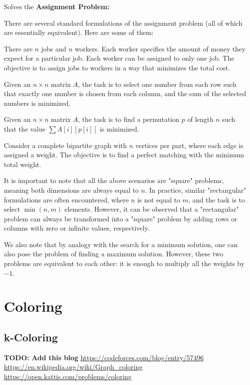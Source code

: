 	Solves the \textbf{Assignment Problem:}

	There are several standard formulations of the assignment problem (all of which are essentially equivalent). Here are some of them:

	There are $n$ jobs and $n$ workers. Each worker specifies the amount of money they expect for a particular job.
	Each worker can be assigned to only one job. The objective is to assign jobs to workers in a way that minimizes the total cost.

	Given an $n \times n$ matrix $A$, the task is to select one number from each row such that exactly 
	one number is chosen from each column, and the sum of the selected numbers is minimized.

	Given an $n \times n$ matrix $A$, the task is to find a permutation $p$ of length $n$ such that the value
	$\sum A[i]\left[p[i]\right]$ is minimized.

	Consider a complete bipartite graph with $n$ vertices per part, where each edge is assigned a weight.
	The objective is to find a perfect matching with the minimum total weight.

	It is important to note that all the above scenarios are "square" problems, meaning both dimensions are always equal to
	$n$. In practice, similar "rectangular" formulations are often encountered, where $n$ is not equal to 
	$m$, and the task is to select $\min(n,m)$ elements. However, it can be observed that a "rectangular" 
	problem can always be transformed into a "square" problem by adding rows or columns with zero or infinite values, respectively.

	We also note that by analogy with the search for a minimum solution, one can also pose the problem of finding a maximum solution. 
	However, these two problems are equivalent to each other: it is enough to multiply all the weights by $-1$.

	
\section{Coloring}

	\subsection{k-Coloring}

		\textbf{TODO: Add this blog}
		\url{https://codeforces.com/blog/entry/57496}
		\url{https://en.wikipedia.org/wiki/Graph_coloring}
		\url{https://open.kattis.com/problems/coloring}

